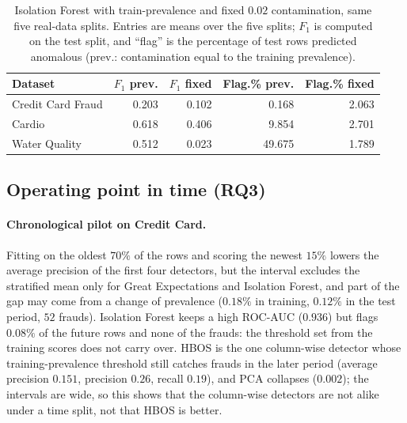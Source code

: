 \documentclass[conference]{IEEEtran}
\begin{document}
\begin{table}[t]
\caption{Isolation Forest with train-prevalence and fixed $0.02$
contamination, same five real-data splits. Entries are means over the five
splits; $F_1$ is computed on the test split, and ``flag'' is the percentage of test rows
predicted anomalous (prev.: contamination equal to the training prevalence).}
\label{tab:fixed-calibration}
\centering
\setlength{\tabcolsep}{4pt}
\footnotesize
\begin{tabular}{lrrrr}
\toprule
Dataset & $F_1$ prev. & $F_1$ fixed & Flag.\% prev. & Flag.\% fixed \\
\midrule
Credit Card Fraud & 0.203 & 0.102 & 0.168 & 2.063 \\
Cardio            & 0.618 & 0.406 & 9.854 & 2.701 \\
Water Quality     & 0.512 & 0.023 & 49.675 & 1.789 \\
\bottomrule
\end{tabular}
\end{table}

\subsection{Operating point in time (RQ3)}
\label{sec:time}
\paragraph{Chronological pilot on Credit Card.} Fitting on the oldest $70\%$ of the rows and
scoring the newest $15\%$ lowers the average precision of the first four detectors, but the
interval excludes the stratified mean only for Great Expectations and Isolation Forest, and part of
the gap may come from a change of prevalence ($0.18\%$ in training, $0.12\%$ in the test period,
$52$ frauds). Isolation Forest keeps a high ROC-AUC ($0.936$) but flags $0.08\%$ of the future rows
and none of the frauds: the threshold set from the training scores does not carry over. HBOS is the
one column-wise detector whose training-prevalence threshold still catches frauds in the later
period (average precision $0.151$, precision $0.26$, recall $0.19$), and PCA collapses ($0.002$);
the intervals are wide, so this shows that the column-wise detectors are not alike under a time
split, not that HBOS is better.
\end{document}

